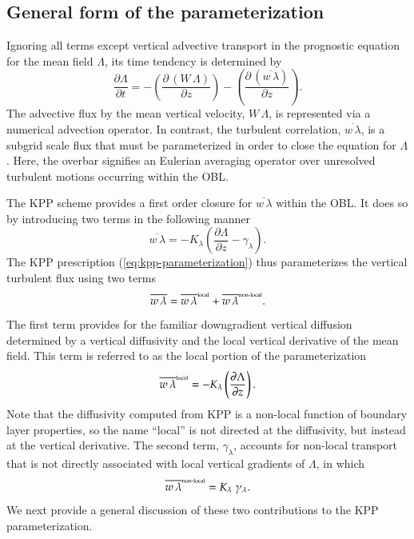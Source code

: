  
\subsection{General form of the parameterization}

Ignoring all terms except vertical advective transport in the
prognostic equation for the mean field $\Lambda$, its time tendency 
is determined by 
\begin{equation}
 \frac{\partial \Lambda}{\partial t} = -\left( \frac{\partial \, (W \, \Lambda)}{\partial z} \right)  
 -\left( \frac{\partial \, (\overline{w \, \lambda}) }{\partial z} \right).  
\label{eq:mean-field-equation-kpp}
\end{equation}
The advective flux by the mean vertical velocity, $W \, \Lambda$, is
represented via a numerical advection operator. In contrast, the
turbulent correlation, $\overline{w \, \lambda}$, is a subgrid scale
flux that must be parameterized in order to close the equation for
$\Lambda$. Here, the overbar signifies an Eulerian averaging operator
over unresolved turbulent motions occurring within the OBL.

The KPP scheme provides a first order closure for $\overline{w \,
  \lambda}$ within the OBL. It does so by introducing two terms in the
following manner 
\begin{equation}
  \overline{w \, \lambda} = -K_{\lambda} \left( \frac{\partial \Lambda}{\partial z} - \gamma_{\lambda} \right).
\label{eq:kpp-parameterization}
\end{equation}
The KPP prescription (\ref{eq:kpp-parameterization}) thus
parameterizes the vertical turbulent flux using two terms
\begin{equation}
  \overline{w \, \lambda} = \overline{w \, \lambda}^{\mbox{\tiny local}} + \overline{w \, \lambda}^{\mbox{\tiny non-local}}.
\label{eq:vertical-flux-decomposed}
\end{equation}
The first term provides for the familiar downgradient vertical
diffusion determined by a vertical diffusivity and the local vertical
derivative of the mean field.  This term is referred to as the local
portion of the parameterization
\begin{equation}
\overline{w \, \lambda}^{\mbox{\tiny local}} = -K_{\lambda} \left( \frac{\partial \Lambda}{\partial z} \right).
\label{eq:vertical-flux-local}
\end{equation}
Note that the diffusivity computed from KPP is a non-local function of
boundary layer properties, so the name ``local'' is not directed at
the diffusivity, but instead at the vertical derivative.  The second
term, $\gamma_{\lambda}$, accounts for non-local transport that is not
directly associated with local vertical gradients of $\Lambda$, in
which
\begin{equation}
\overline{w \, \lambda}^{\mbox{\tiny non-local}} = K_{\lambda} \; \gamma_{\lambda}.
\label{eq:vertical-flux-nonlocal}
\end{equation}
We next provide a general discussion of these two contributions to the
KPP parameterization.


